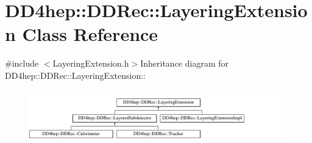 \hypertarget{class_d_d4hep_1_1_d_d_rec_1_1_layering_extension}{
\section{DD4hep::DDRec::LayeringExtension Class Reference}
\label{class_d_d4hep_1_1_d_d_rec_1_1_layering_extension}
}


{\ttfamily \#include $<$LayeringExtension.h$>$}Inheritance diagram for DD4hep::DDRec::LayeringExtension::\begin{figure}[H]
\begin{center}
\leavevmode
\includegraphics[height=2.29508cm]{class_d_d4hep_1_1_d_d_rec_1_1_layering_extension}
\end{center}
\end{figure}
